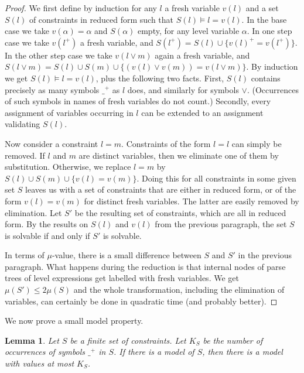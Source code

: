 \documentclass[11pt,a4paper]{article}
\newtheorem{lemma}{Lemma}[theorem]
\newcommand{\set}[1]{\{#1\}}
\begin{document}
\begin{proof}
We first define by induction for any $l$ a fresh variable $v(l)$ and
a set $S(l)$ of constraints in reduced form such that $S(l)\models l = v(l)$.
In the base case we take $v(\alpha)=\alpha$ and $S(\alpha)$ empty, for any
level variable $\alpha$. In one step case we take $v(l^+)$ a fresh variable,
and $S(l^+) = S(l) \cup \set{v(l)^+ =v(l^+)}$.
In the other step case we take $v(l\vee m)$ again a fresh variable,
and $S(l\vee m) = S(l) \cup S(m) \cup \set{(v(l)\vee v(m)) =v(l\vee m)}$.
By induction we get $S(l)\models l = v(l)$, plus the following two facts.
First, $S(l)$ contains precisely as many symbols $\_^+$ as $l$ does,
and similarly for symbols $\vee$.
(Occurrences of such symbols in names of fresh variables do not count.)
Secondly, every assignment of variables occurring in $l$ can be extended to an
assignment validating $S(l)$.

Now consider a constraint $l=m$. Constraints of the form $l=l$ can
simply be removed. If $l$ and $m$ are distinct variables,
then we eliminate one of them by substitution. Otherwise,
we replace $l=m$ by $S(l)\cup S(m)\cup \set{v(l)=v(m)}$.
Doing this for all constraints in some given set $S$
leaves us with a set of constraints that are either in
reduced form, or of the form $v(l)=v(m)$ for distinct fresh variables.
The latter are easily removed by elimination. Let $S'$ be the resulting set
of constraints, which are all in reduced form. By the results on $S(l)$
and $v(l)$ from the previous paragraph, the set $S$ is solvable if
and only if $S'$ is solvable.

In terms of $\mu$-value, there is a small
difference between $S$ and $S'$ in the previous paragraph.
What happens during the reduction is that internal nodes
of parse trees of level expressions get labelled with fresh variables.
We get $\mu(S')\leq 2\mu(S)$ and the whole transformation, including the
elimination of variables, can certainly be done in quadratic time
(and probably better).
\end{proof}

We now prove a small model property.
\begin{lemma}\label{lem:small-model}
Let  $S$ be a finite set of constraints.
Let $K_{S}$ be the number of occurrences of symbols $\_^+$ in $S$.
If there is a model of $S$, then there is a model with values at most $K_{S}$.
\end{lemma}
\end{document}
